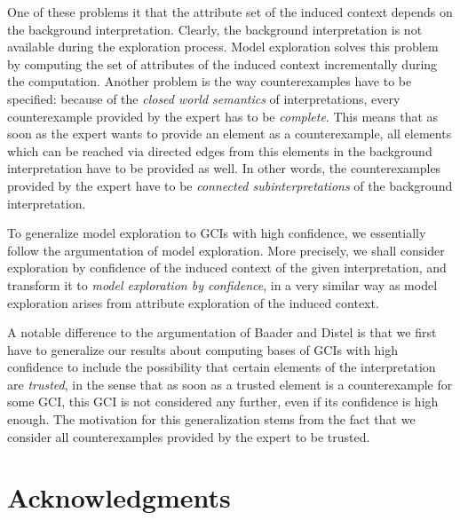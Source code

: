 One of these problems it that the attribute set of the induced context depends on the
background interpretation.  Clearly, the background interpretation is not available during
the exploration process.  Model exploration solves this problem by computing the set of
attributes of the induced context incrementally during the computation.  Another problem
is the way counterexamples have to be specified: because of the \emph{closed world
  semantics} of interpretations, every counterexample provided by the expert has to be
\emph{complete}.  This means that as soon as the expert wants to provide an element as a
counterexample, all elements which can be reached via directed edges from this elements in
the background interpretation have to be provided as well.  In other words, the
counterexamples provided by the expert have to be \emph{connected subinterpretations} of
the background interpretation.

To generalize model exploration to GCIs with high confidence, we essentially follow the
argumentation of model exploration.  More precisely, we shall consider exploration by
confidence of the induced context of the given interpretation, and transform it to
\emph{model exploration by confidence}, in a very similar way as model exploration arises
from attribute exploration of the induced context.

A notable difference to the argumentation of Baader and Distel is that we first have to
generalize our results about computing bases of GCIs with high confidence to include the
possibility that certain elements of the interpretation are \emph{trusted}, in the sense
that as soon as a trusted element is a counterexample for some GCI, this GCI is not
considered any further, even if its confidence is high enough.  The motivation for this
generalization stems from the fact that we consider all counterexamples provided by the
expert to be trusted.

\section*{Acknowledgments}
\label{sec:acknowledgements}



